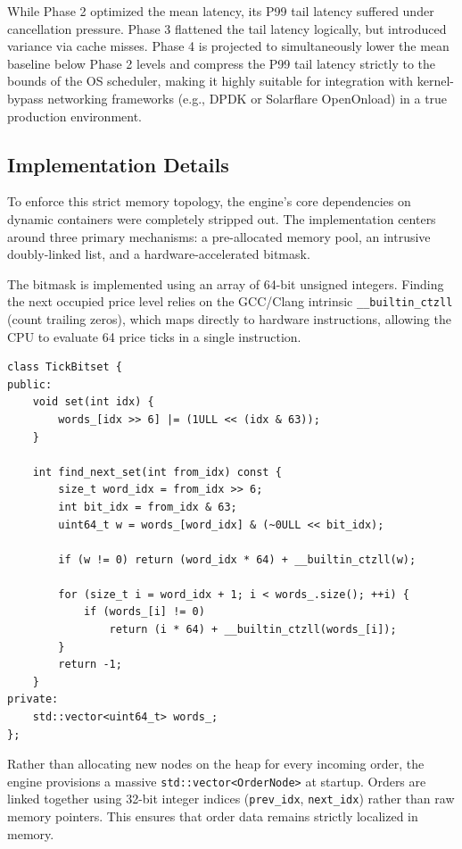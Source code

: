 \documentclass{article}
\begin{document}
While Phase 2 optimized the mean latency, its P99 tail latency suffered under cancellation pressure. Phase 3 flattened the tail latency logically, but introduced variance via cache misses. Phase 4 is projected to simultaneously lower the mean baseline below Phase 2 levels and compress the P99 tail latency strictly to the bounds of the OS scheduler, making it highly suitable for integration with kernel-bypass networking frameworks (e.g., DPDK or Solarflare OpenOnload) in a true production environment.

\subsection{Implementation Details}

To enforce this strict memory topology, the engine's core dependencies on dynamic containers were completely stripped out. The implementation centers around three primary mechanisms: a pre-allocated memory pool, an intrusive doubly-linked list, and a hardware-accelerated bitmask.

The bitmask is implemented using an array of 64-bit unsigned integers. Finding the next occupied price level relies on the GCC/Clang intrinsic \texttt{\_\_builtin\_ctzll} (count trailing zeros), which maps directly to hardware instructions, allowing the CPU to evaluate 64 price ticks in a single instruction.

\begin{lstlisting}[caption={Hardware-Accelerated Tick Bitset}]
class TickBitset {
public:
    void set(int idx) { 
        words_[idx >> 6] |= (1ULL << (idx & 63)); 
    }
    
    int find_next_set(int from_idx) const {
        size_t word_idx = from_idx >> 6;
        int bit_idx = from_idx & 63;
        uint64_t w = words_[word_idx] & (~0ULL << bit_idx);
        
        if (w != 0) return (word_idx * 64) + __builtin_ctzll(w);
        
        for (size_t i = word_idx + 1; i < words_.size(); ++i) {
            if (words_[i] != 0) 
                return (i * 64) + __builtin_ctzll(words_[i]);
        }
        return -1;
    }
private:
    std::vector<uint64_t> words_;
};
\end{lstlisting}

Rather than allocating new nodes on the heap for every incoming order, the engine provisions a massive \texttt{std::vector<OrderNode>} at startup. Orders are linked together using 32-bit integer indices (\texttt{prev\_idx}, \texttt{next\_idx}) rather than raw memory pointers. This ensures that order data remains strictly localized in memory.
\end{document}
